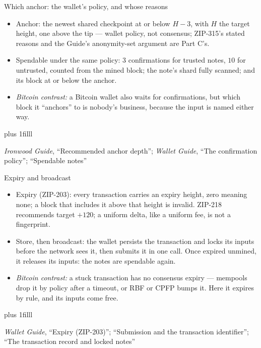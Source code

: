 \documentclass[aspectratio=169,11pt]{beamer}
\newcommand{\src}[1]{\par\vskip0pt plus 1filll
  {\fontsize{6}{7.2}\selectfont\color{arbdim}\raggedright #1\par}}
\begin{document}
\begin{frame}{Which anchor: the wallet's policy, and whose reasons}
\begin{itemize}
  \item Anchor: the newest shared checkpoint at or below $H - 3$, with
    $H$ the target height, one above the tip --- wallet policy, not
    consensus; ZIP-315's stated reasons and the Guide's anonymity-set
    argument are Part C's.
  \item Spendable under the same policy: $3$ confirmations for trusted
    notes, $10$ for untrusted, counted from the mined block; the note's
    shard fully scanned; and its block at or below the anchor.
  \item \emph{Bitcoin contrast:} a Bitcoin wallet also waits for
    confirmations, but which block it ``anchors'' to is nobody's
    business, because the input is named either way.
\end{itemize}
\src{\emph{Ironwood Guide}, ``Recommended anchor depth''; \emph{Wallet Guide},
  ``The confirmation policy''; ``Spendable notes''}
\end{frame}

\begin{frame}{Expiry and broadcast}
\begin{itemize}
  \item Expiry (ZIP-203): every transaction carries an expiry height,
    zero meaning none; a block that includes it above that height is
    invalid. ZIP-218 recommends target $+ 120$; a uniform delta, like a
    uniform fee, is not a fingerprint.
  \item Store, then broadcast: the wallet persists the transaction and
    locks its inputs before the network sees it, then submits it in one
    call. Once expired unmined, it releases its inputs: the notes are
    spendable again.
  \item \emph{Bitcoin contrast:} a stuck transaction has no consensus
    expiry --- mempools drop it by policy after a timeout, or RBF or CPFP
    bumps it. Here it expires by rule, and its inputs come free.
\end{itemize}
\src{\emph{Wallet Guide}, ``Expiry (ZIP-203)''; ``Submission and the transaction
  identifier''; ``The transaction record and locked notes''}
\end{frame}
\end{document}
